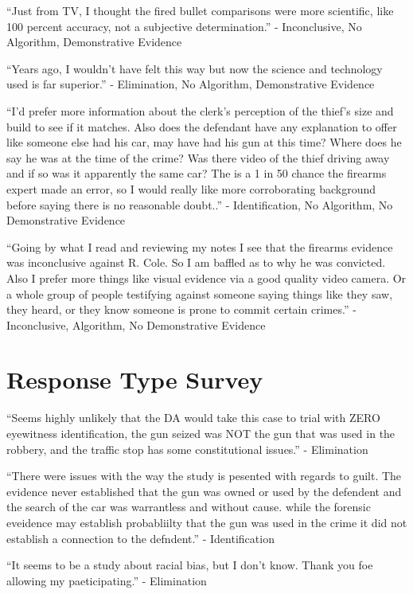 \documentclass[print]{nuthesis}
\begin{document}
``Just from TV, I thought the fired bullet comparisons were more scientific, like 100 percent accuracy, not a subjective determination.'' - Inconclusive, No Algorithm, Demonstrative Evidence

``Years ago, I wouldn't have felt this way but now the science and technology used is far superior.'' - Elimination, No Algorithm, Demonstrative Evidence

``I'd prefer more information about the clerk's perception of the thief's size and build to see if it matches. Also does the defendant have any explanation to offer like someone else had his car, may have had his gun at this time? Where does he say he was at the time of the crime? Was there video of the thief driving away and if so was it apparently the same car? The is a 1 in 50 chance the firearms expert made an error, so I would really like more corroborating background before saying there is no reasonable doubt..'' - Identification, No Algorithm, No Demonstrative Evidence

``Going by what I read and reviewing my notes I see that the firearms evidence was inconclusive against R. Cole. So I am baffled as to why he was convicted. Also I prefer more things like visual evidence via a good quality video camera. Or a whole group of people testifying against someone saying things like they saw, they heard, or they know someone is prone to commit certain crimes.'' - Inconclusive, Algorithm, No Demonstrative Evidence

\hypertarget{response-type-survey}{%
\section{Response Type Survey}\label{response-type-survey}}

``Seems highly unlikely that the DA would take this case to trial with ZERO eyewitness identification, the gun seized was NOT the gun that was used in the robbery, and the traffic stop has some constitutional issues.'' - Elimination

``There were issues with the way the study is pesented with regards to guilt. The evidence never established that the gun was owned or used by the defendent and the search of the car was warrantless and without cause. while the forensic eveidence may establish probabliilty that the gun was used in the crime it did not establish a connection to the defndent.'' - Identification

``It seems to be a study about racial bias, but I don't know. Thank you foe allowing my paeticipating.'' - Elimination
\end{document}
